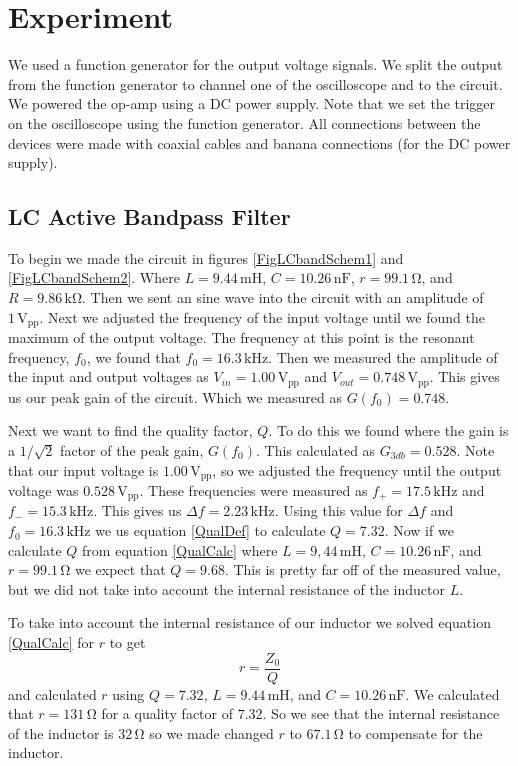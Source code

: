 \documentclass[11pt]{article}
\numberwithin{equation}{section}
\numberwithin{figure}{section}
\numberwithin{table}{section}
\newcommand{\unit}[1]{\ensuremath{\, \mathrm{#1}}}
\begin{document}
\section{Experiment}
We used a function generator for the output voltage signals. We split the output from the function generator to channel one of the oscilloscope and to the circuit. We powered the op-amp using a DC power supply. Note that we set the trigger on the oscilloscope using the function generator. All connections between the devices were made with coaxial cables and banana connections (for the DC power supply).

\subsection{LC Active Bandpass Filter}
To begin we made the circuit in figures \ref{FigLCbandSchem1} and \ref{FigLCbandSchem2}. Where $L=9.44\unit{mH}$, $C=10.26\unit{nF}$, $r=99.1\unit{\Omega}$, and $R=9.86\unit{k\Omega}$. Then we sent an sine wave into the circuit with an amplitude of $1\unit{V_{pp}}$. Next we adjusted the frequency of the input voltage until we found the maximum of the output voltage. The frequency at this point is the resonant frequency, $f_0$, we found that $f_0=16.3\unit{kHz}$. Then we measured the amplitude of the input and output voltages as $V_{in}=1.00\unit{V_{pp}}$ and $V_{out} = 0.748\unit{V_{pp}}$. This gives us our peak gain of the circuit. Which we measured as $G(f_0)=0.748$. 

Next we want to find the quality factor, $Q$. To do this we found where the gain is a $1/\sqrt{2}$ factor of the peak gain, $G(f_0)$. This calculated as $G_{3db} = 0.528$. Note that our input voltage is $1.00\unit{V_{pp}}$, so we adjusted the frequency until the output voltage was $0.528\unit{V_{pp}}$. These frequencies were measured as $f_+=17.5\unit{kHz}$ and $f_-=15.3\unit{kHz}$. This gives us $\Delta f=2.23\unit{kHz}$. Using this value for $\Delta f$ and $f_0=16.3\unit{kHz}$ we us equation \ref{QualDef} to calculate $Q=7.32$. Now if we calculate $Q$ from equation \ref{QualCalc} where $L=9,44\unit{mH}$, $C=10.26\unit{nF}$, and $r=99.1\unit{\Omega}$ we expect that $Q = 9.68$. This is pretty far off of the measured value, but we did not take into account the internal resistance of the inductor $L$.

To take into account the internal resistance of our inductor we solved equation \ref{QualCalc} for $r$ to get
$$r = \frac{Z_0}{Q}$$
and calculated $r$ using $Q=7.32$, $L=9.44\unit{mH}$, and $C=10.26\unit{nF}$. We calculated that $r=131\unit{\Omega}$ for a quality factor of $7.32$. So we see that the internal resistance of the inductor is $32\unit{\Omega}$ so we made changed $r$ to $67.1\unit{\Omega}$ to compensate for the inductor.
\end{document}
